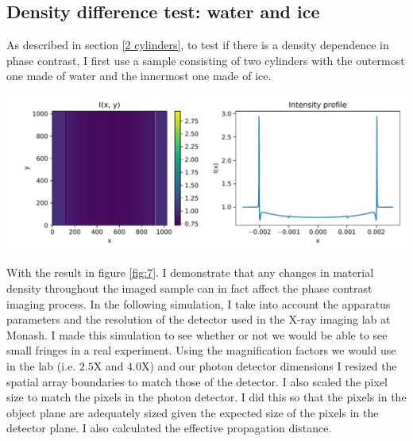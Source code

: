 \documentclass[10pt, a4paper, singlespacing]{report}
\newenvironment{Figure}
    {\par\medskip\noindent\minipage{\linewidth}}
    {\endminipage\par\medskip}
\begin{document}
\subsection{Density difference test: water and ice}
As described in section \ref{2 cylinders}, to test if there is a density dependence in phase contrast, I first use a sample consisting of two cylinders with the outermost one made of water and the innermost one made of ice.
\begin{Figure}
\centering
\includegraphics[width=\linewidth]{ice_water_AS.pdf}
\label{fig:7}
\end{Figure}
With the result in figure \ref{fig:7}. I demonstrate that any changes in material density throughout the imaged sample can in fact affect the phase contrast imaging process.
In the following simulation, I take into account the apparatus parameters and the resolution of the detector used in the X-ray imaging lab at Monash. I made this simulation to see whether or not we would be able to see small fringes in a real experiment. Using the magnification factors we would use in the lab (i.e. $2.5$X and $4.0$X) and our photon detector dimensions I resized the spatial array boundaries to match those of the detector. I also scaled the pixel size to match the pixels in the photon detector. I did this so that the pixels in the object plane are adequately sized given the expected size of the pixels in the detector plane. I also calculated the effective propagation distance.
\end{document}
